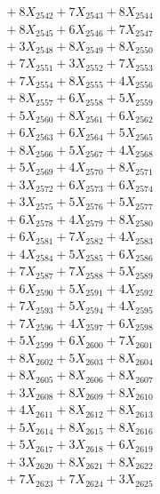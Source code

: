 \documentclass[a4paper,10pt]{article}
\begin{document}
{\begin{align}
&\;  + 8 X_{2542} + 7 X_{2543} + 8 X_{2544} \\[0.3ex]
&\;  + 8 X_{2545} + 6 X_{2546} + 7 X_{2547} \\[0.3ex]
&\;  + 3 X_{2548} + 8 X_{2549} + 8 X_{2550} \\[0.3ex]
&\;  + 7 X_{2551} + 3 X_{2552} + 7 X_{2553} \\[0.3ex]
&\;  + 7 X_{2554} + 8 X_{2555} + 4 X_{2556} \\[0.3ex]
&\;  + 8 X_{2557} + 6 X_{2558} + 5 X_{2559} \\[0.5ex]\allowbreak
&\;  + 5 X_{2560} + 8 X_{2561} + 6 X_{2562} \\[0.3ex]
&\;  + 6 X_{2563} + 6 X_{2564} + 5 X_{2565} \\[0.3ex]
&\;  + 8 X_{2566} + 5 X_{2567} + 4 X_{2568} \\[0.3ex]
&\;  + 5 X_{2569} + 4 X_{2570} + 8 X_{2571} \\[0.3ex]
&\;  + 3 X_{2572} + 6 X_{2573} + 6 X_{2574} \\[0.3ex]
&\;  + 3 X_{2575} + 5 X_{2576} + 5 X_{2577} \\[0.3ex]
&\;  + 6 X_{2578} + 4 X_{2579} + 8 X_{2580} \\[0.3ex]
&\;  + 6 X_{2581} + 7 X_{2582} + 4 X_{2583} \\[0.3ex]
&\;  + 4 X_{2584} + 5 X_{2585} + 6 X_{2586} \\[0.3ex]
&\;  + 7 X_{2587} + 7 X_{2588} + 5 X_{2589} \\[0.5ex]\allowbreak
&\;  + 6 X_{2590} + 5 X_{2591} + 4 X_{2592} \\[0.3ex]
&\;  + 7 X_{2593} + 5 X_{2594} + 4 X_{2595} \\[0.3ex]
&\;  + 7 X_{2596} + 4 X_{2597} + 6 X_{2598} \\[0.3ex]
&\;  + 5 X_{2599} + 6 X_{2600} + 7 X_{2601} \\[0.3ex]
&\;  + 8 X_{2602} + 5 X_{2603} + 8 X_{2604} \\[0.3ex]
&\;  + 8 X_{2605} + 8 X_{2606} + 8 X_{2607} \\[0.3ex]
&\;  + 3 X_{2608} + 8 X_{2609} + 8 X_{2610} \\[0.3ex]
&\;  + 4 X_{2611} + 8 X_{2612} + 8 X_{2613} \\[0.3ex]
&\;  + 5 X_{2614} + 8 X_{2615} + 8 X_{2616} \\[0.3ex]
&\;  + 5 X_{2617} + 3 X_{2618} + 6 X_{2619} \\[0.5ex]\allowbreak
&\;  + 3 X_{2620} + 8 X_{2621} + 8 X_{2622} \\[0.3ex]
&\;  + 7 X_{2623} + 7 X_{2624} + 3 X_{2625} \\[0.3ex]

\end{align}}
\end{document}
